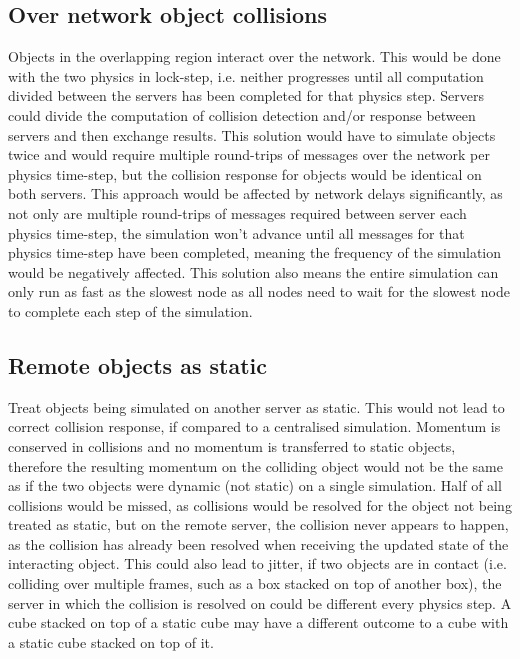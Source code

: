 \subsection{Over network object collisions}
Objects in the overlapping region interact over the network. This would be done with the two physics in lock-step, i.e. neither progresses until all computation divided between the servers has been completed for that physics step. Servers could divide the computation of collision detection and/or response between servers and then exchange results. This solution would have to simulate objects twice and would require multiple round-trips of messages over the network per physics time-step, but the collision response for objects would be identical on both servers. This approach would be affected by network delays significantly, as not only are multiple round-trips of messages required between server each physics time-step, the simulation won't advance until all messages for that physics time-step have been completed, meaning the frequency of the simulation would be negatively affected. This solution also means the entire simulation can only run as fast as the slowest node as all nodes need to wait for the slowest node to complete each step of the simulation.


\subsection{Remote objects as static}
Treat objects being simulated on another server as static. This would not lead to correct collision response, if compared to a centralised simulation. Momentum is conserved in collisions and no momentum is transferred to static objects, therefore the resulting momentum on the colliding object would not be the same as if the two objects were dynamic (not static) on a single simulation.
Half of all collisions would be missed, as collisions would be resolved for the object not being treated as static, but on the remote server, the collision never appears to happen, as the collision has already been resolved when receiving the updated state of the interacting object.
This could also lead to jitter, if two objects are in contact (i.e. colliding over multiple frames, such as a box stacked on top of another box), the server in which the collision is resolved on could be different every physics step. A cube stacked on top of a static cube may have a different outcome to a cube with a static cube stacked on top of it.


